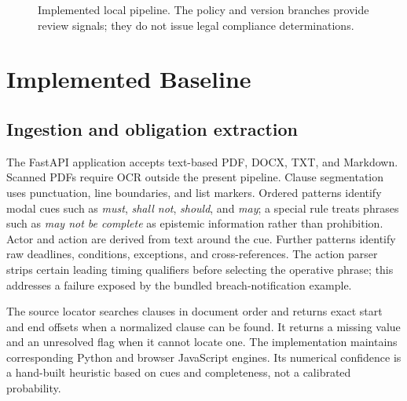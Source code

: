 \documentclass[11pt,a4paper]{article}
\begin{document}
\begin{figure}[t]
\centering
{}
\caption{Implemented local pipeline. The policy and version branches provide review signals; they do not issue legal compliance determinations.}
\label{fig:pipeline}
\end{figure}

\section{Implemented Baseline}
\subsection{Ingestion and obligation extraction}
The FastAPI application accepts text-based PDF, DOCX, TXT, and Markdown. Scanned PDFs require OCR outside the present pipeline. Clause segmentation uses punctuation, line boundaries, and list markers. Ordered patterns identify modal cues such as \emph{must}, \emph{shall not}, \emph{should}, and \emph{may}; a special rule treats phrases such as \emph{may not be complete} as epistemic information rather than prohibition. Actor and action are derived from text around the cue. Further patterns identify raw deadlines, conditions, exceptions, and cross-references. The action parser strips certain leading timing qualifiers before selecting the operative phrase; this addresses a failure exposed by the bundled breach-notification example.

The source locator searches clauses in document order and returns exact start and end offsets when a normalized clause can be found. It returns a missing value and an unresolved flag when it cannot locate one. The implementation maintains corresponding Python and browser JavaScript engines. Its numerical confidence is a hand-built heuristic based on cues and completeness, not a calibrated probability.
\end{document}
